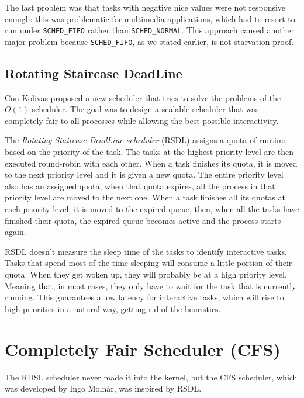The last problem was that tasks with negative nice values were not responsive enough: this was problematic for multimedia applications, which had to resort to run under \verb|SCHED_FIFO| rather than \verb|SCHED_NORMAL|. This approach caused another major problem because \verb|SCHED_FIFO|, as we stated earlier, is not starvation proof.

\subsection{Rotating Staircase DeadLine}
Con Kolivas proposed a new scheduler that tries to solve the problems of the $O(1)$ scheduler. The goal was to design a scalable scheduler that was completely fair to all processes while allowing the best possible interactivity.\cite{con}

The \textit{Rotating Staircase DeadLine scheduler} (RSDL) assigns a quota of
runtime based on the priority of the task. The tasks at the highest
priority level are then executed round-robin with each other. When a
task finishes its quota, it is moved to the next priority level and it
is given a new quota. The entire priority level also has an assigned
quota, when that quota expires, all the process in that priority level
are moved to the next one. When a task finishes all its quotas at each
priority level, it is moved to the expired queue, then, when all the tasks
have finished their quota, the expired queue becomes active and the
process starts again.

RSDL doesn't measure the sleep time of the tasks to identify interactive tasks. Tasks that spend most of the time sleeping will consume a little portion of their quota. When they get woken up, they will probably be at a high priority level. Meaning that, in most cases, they only have to wait for the task that is currently running. This guarantees a low latency for interactive tasks, which will rise to high priorities in a natural way, getting rid of the heuristics. 

\section{Completely Fair Scheduler (CFS)}
\label{sec:CFS}
The RDSL scheduler never made it into the kernel, but the CFS scheduler, which was developed by Ingo Moln\'ar\cite{ingo}, was inspired by RSDL.


